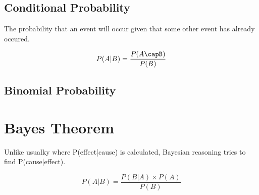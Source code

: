 \documentclass[11pt]{article}
\begin{document}
\subsection{Conditional Probability}
\label{sec:org9ae99d4}

The probability that an event will occur given that some other event has already occured.

\[
P(A|B) = \frac{P(A\capB)}{P(B)}
\]
\subsection{Binomial Probability}
\label{sec:orgd25d6a0}
\section{Bayes Theorem}
\label{sec:orga142557}

Unlike usualky where P(effect|cause) is calculated, Bayesian reasoning tries to find P(cause|effect).

\[
P(A | B) = \frac{P(B | A) \times P(A)}{P(B)}
\]
\end{document}
